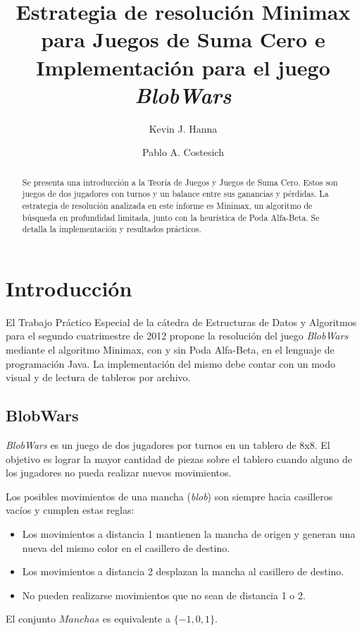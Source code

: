 \documentclass[10pt,a4paper,notitlepage,draft]{article}
\author[1]{\rm Kevin J. Hanna}
\author[2]{\rm Pablo A. Costesich}
\affil[ ]{Alumnos de Ingeniería Informática}
\affil[ ]{Instituto Tecnológico de Buenos Aires}
\affil[ ]{Av. Madero 399, C.A.B.A., Argentina}
\affil[1]{\textit {khanna@alu.itba.edu.ar}}
\affil[2]{\textit {pcostesi@ieee.org}}
\title{Estrategia de resolución Minimax para Juegos de Suma Cero e Implementación para el juego \textit {BlobWars}}
\newenvironment{definition}[1][Definición]{\begin{trivlist}
\item[\hskip \labelsep {\bfseries #1}]}{\end{trivlist}}
\begin{document}
\maketitle
\begin{abstract}
Se presenta una introducción a la Teoría de Juegos y Juegos de Suma Cero. Estos son juegos de dos jugadores con turnos y un balance entre sus ganancias y pérdidas. La estrategia de resolución analizada en este informe es Minimax, un algoritmo de búsqueda en profundidad limitada, junto con la heurística de Poda Alfa-Beta. Se detalla la implementación y resultados prácticos.
\end{abstract}

\section{Introducción}
El Trabajo Práctico Especial de la cátedra de Estructuras de Datos y Algoritmos para el segundo cuatrimestre de 2012 propone la resolución del juego \textit{BlobWars} mediante el algoritmo Minimax, con y sin Poda Alfa-Beta, en el lenguaje de programación Java. La implementación del mismo debe contar con un modo visual y de lectura de tableros por archivo.


\subsection{BlobWars}
\textit{BlobWars} es un juego de dos jugadores por turnos en un tablero de 8x8. El objetivo es lograr la mayor cantidad de piezas sobre el tablero cuando alguno de los jugadores no pueda realizar nuevos movimientos.

Los posibles movimientos de una mancha (\textit{blob}) son siempre hacia casilleros vacíos y cumplen estas reglas:
\begin{itemize}
\item Los movimientos a distancia 1 mantienen la mancha de origen y generan una nueva del mismo color en el casillero de destino.
\item Los movimientos a distancia 2 desplazan la mancha al casillero de destino.
\item No pueden realizarse movimientos que no sean de distancia 1 o 2.
\end{itemize}

\begin{definition}
El conjunto $Manchas$ es equivalente a $\{-1, 0, 1\}$.
\end{definition}
\end{document}
